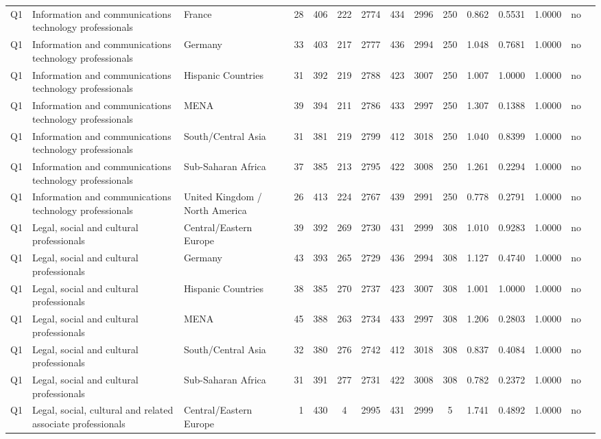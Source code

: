 \begin{longtable}{lllrcccccccccll}
Q1 & Information and communications technology professionals & France & 28 & 406 & 222 & 2774 & 434 & 2996 & 250 & 0.862 & 0.5531 & 1.0000 & no \\
Q1 & Information and communications technology professionals & Germany & 33 & 403 & 217 & 2777 & 436 & 2994 & 250 & 1.048 & 0.7681 & 1.0000 & no \\
Q1 & Information and communications technology professionals & Hispanic Countries & 31 & 392 & 219 & 2788 & 423 & 3007 & 250 & 1.007 & 1.0000 & 1.0000 & no \\
Q1 & Information and communications technology professionals & MENA & 39 & 394 & 211 & 2786 & 433 & 2997 & 250 & 1.307 & 0.1388 & 1.0000 & no \\
Q1 & Information and communications technology professionals & South/Central Asia & 31 & 381 & 219 & 2799 & 412 & 3018 & 250 & 1.040 & 0.8399 & 1.0000 & no \\
Q1 & Information and communications technology professionals & Sub-Saharan Africa & 37 & 385 & 213 & 2795 & 422 & 3008 & 250 & 1.261 & 0.2294 & 1.0000 & no \\
Q1 & Information and communications technology professionals & United Kingdom / North America & 26 & 413 & 224 & 2767 & 439 & 2991 & 250 & 0.778 & 0.2791 & 1.0000 & no \\
Q1 & Legal, social and cultural professionals & Central/Eastern Europe & 39 & 392 & 269 & 2730 & 431 & 2999 & 308 & 1.010 & 0.9283 & 1.0000 & no \\
Q1 & Legal, social and cultural professionals & Germany & 43 & 393 & 265 & 2729 & 436 & 2994 & 308 & 1.127 & 0.4740 & 1.0000 & no \\
Q1 & Legal, social and cultural professionals & Hispanic Countries & 38 & 385 & 270 & 2737 & 423 & 3007 & 308 & 1.001 & 1.0000 & 1.0000 & no \\
Q1 & Legal, social and cultural professionals & MENA & 45 & 388 & 263 & 2734 & 433 & 2997 & 308 & 1.206 & 0.2803 & 1.0000 & no \\
Q1 & Legal, social and cultural professionals & South/Central Asia & 32 & 380 & 276 & 2742 & 412 & 3018 & 308 & 0.837 & 0.4084 & 1.0000 & no \\
Q1 & Legal, social and cultural professionals & Sub-Saharan Africa & 31 & 391 & 277 & 2731 & 422 & 3008 & 308 & 0.782 & 0.2372 & 1.0000 & no \\
Q1 & Legal, social, cultural and related associate professionals & Central/Eastern Europe & 1 & 430 & 4 & 2995 & 431 & 2999 & 5 & 1.741 & 0.4892 & 1.0000 & no \\

\end{longtable}
